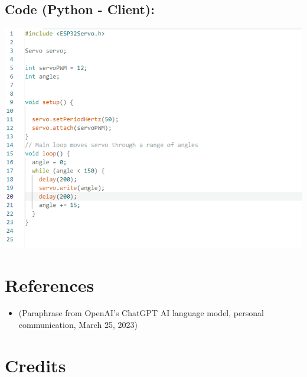 \documentclass[a4paper,12pt]{report}
\newcommand{\diagramWidth}{150mm}
\begin{document}
    \subsection*{Code (Python - Client):}
        \begin{mdframed}[linewidth = 3, linecolor = turbo_purple]
            \includegraphics[width = \diagramWidth]{Assets/servoCode.png}
        \end{mdframed}



    \newpage






\section*{References}

        \begin{itemize}
            \item (Paraphrase from OpenAI's ChatGPT AI language model, personal communication, March 25, 2023)
        \end{itemize}


\section*{Credits}
\end{document}
